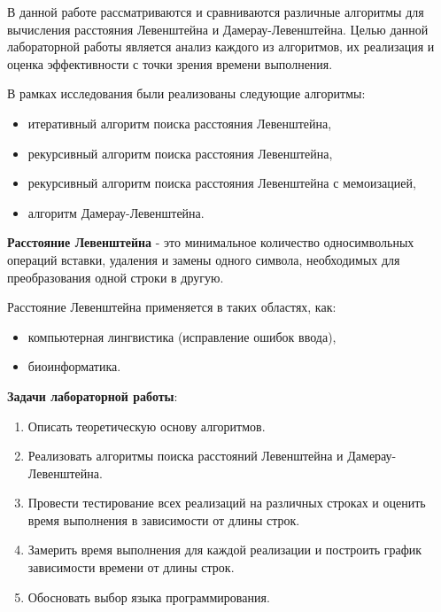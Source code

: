 
В данной работе рассматриваются и сравниваются различные алгоритмы для вычисления расстояния Левенштейна и Дамерау-Левенштейна.
Целью данной лабораторной работы является анализ каждого из алгоритмов, их реализация и оценка эффективности с точки зрения времени выполнения. \cite{lit1}

\vspace{0.5cm}
В рамках исследования были реализованы следующие алгоритмы: \begin{itemize} 
\item итеративный алгоритм поиска расстояния Левенштейна, 
\item рекурсивный алгоритм поиска расстояния Левенштейна, 
\item рекурсивный алгоритм поиска расстояния Левенштейна с мемоизацией,
\item алгоритм Дамерау-Левенштейна. 
\end{itemize}


\vspace{0.5cm}
\textbf {Расстояние Левенштейна} - это минимальное количество односимвольных операций вставки, удаления и замены одного символа, необходимых для преобразования одной строки в другую.

\vspace{0.5cm}
Расстояние Левенштейна применяется в таких областях, как:
\begin{itemize} 
\item компьютерная лингвистика (исправление ошибок ввода),
\item биоинформатика.
\end{itemize}

\vspace{0.5cm}
\textbf {Задачи лабораторной работы}:
\begin{enumerate}
    \item Описать теоретическую основу алгоритмов.
    \item Реализовать алгоритмы поиска расстояний Левенштейна и Дамерау-Левенштейна.
    \item Провести тестирование всех реализаций на различных строках и оценить время выполнения в зависимости от длины строк.
    \item Замерить время выполнения для каждой реализации и построить график зависимости времени от длины строк.
    \item Обосновать выбор языка программирования.
\end{enumerate}

\clearpage
